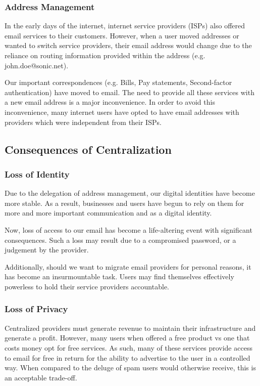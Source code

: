 \documentclass{article}
\theoremstyle{definition}
\begin{document}
\subsubsection{Address Management}

In the early days of the internet, internet service providers (ISPs) also offered email services to their customers. However, when a user moved addresses or wanted to switch service providers, their email address would change due to the reliance on routing information provided within the address (e.g. john.doe@sonic.net). 

Our important correspondences (e.g. Bills, Pay statements, Second-factor authentication) have moved to email. The need to provide all these services with a new email address is a major inconvenience. In order to avoid this inconvenience, many internet users have opted to have email addresses with providers which were independent from their ISPs.

\subsection{Consequences of Centralization}


\subsubsection{Loss of Identity}

Due to the delegation of address management, our digital identities have become more stable. As a result, businesses and users have begun to rely on them for more and more important communication and as a digital identity.

Now, loss of access to our email has become a life-altering event with significant consequences. Such a loss may result due to a compromised password, or a judgement by the provider. 

Additionally, should we want to migrate email providers for personal reasons, it has become an insurmountable task. Users may find themselves effectively powerless to hold their service providers accountable.

\subsubsection{Loss of Privacy}

Centralized providers must generate revenue to maintain their infrastructure and generate a profit. However, many users when offered a free product vs one that costs money opt for free services. As such, many of these services provide access to email for free in return for the ability to advertise to the user in a controlled way. When compared to the deluge of spam users would otherwise receive, this is an acceptable trade-off.
\end{document}
